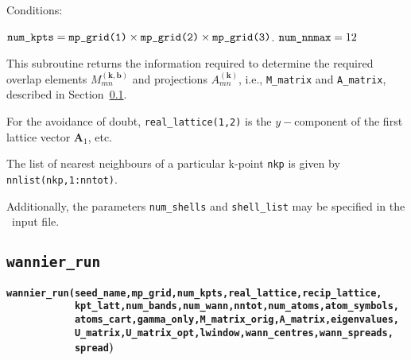 
Conditions:
\begin{itemize}
\cond $\verb#num_kpts# = \verb#mp_grid(1)# \times \verb#mp_grid(2)#
\times \verb#mp_grid(3)#$.
\cond $\verb#num_nnmax# = 12$
\end{itemize}

This subroutine returns the information required to determine the
required overlap elements $M_{mn}^{(\mathbf{k,b})}$ and
projections $A_{mn}^{(\mathbf{k})}$,
i.e., \verb#M_matrix# and \verb#A_matrix#, described in
Section~\ref{wannier_run}. 

For the avoidance of doubt, \verb#real_lattice(1,2)# is the
$y-$component of the first lattice vector $\mathbf{A}_{1}$, etc.

The list of nearest neighbours of a particular k-point \verb#nkp# is
given by \verb#nnlist(nkp,1:nntot)#.

Additionally, the parameters \verb#num_shells# and \verb#shell_list#
may be specified in the \wannier\ input file.

\subsection{{\tt wannier\_run}} \label{wannier_run}

{\noindent \bf \verb#wannier_run(seed_name,mp_grid,num_kpts,real_lattice,recip_lattice,#\\
\verb#            kpt_latt,num_bands,num_wann,nntot,num_atoms,atom_symbols,#\\
\verb#            atoms_cart,gamma_only,M_matrix_orig,A_matrix,eigenvalues,#\\
\verb#            U_matrix,U_matrix_opt,lwindow,wann_centres,wann_spreads,#\\
\verb#            spread#)}


